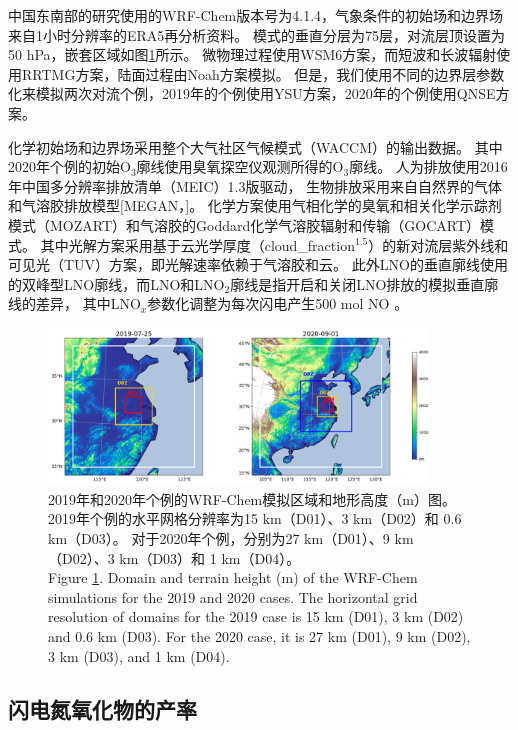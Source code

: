 中国东南部的研究使用的WRF-Chem版本号为4.1.4，气象条件的初始场和边界场来自1小时分辨率的ERA5再分析资料。
模式的垂直分层为75层，对流层顶设置为50 hPa，嵌套区域如图\ref{fig:domains_china}所示。
微物理过程使用WSM6方案\citep{Hong.2006a}，而短波和长波辐射使用RRTMG方案\citep{Iacono.2008}，陆面过程由Noah方案模拟\citep{Koren.1999}。
但是，我们使用不同的边界层参数化来模拟两次对流个例，2019年的个例使用YSU方案\citep{Hong.2006}，2020年的个例使用QNSE方案\citep{Sukoriansky.2005}。

化学初始场和边界场采用整个大气社区气候模式（WACCM）的输出数据。
其中2020年个例的初始O$_3$廓线使用臭氧探空仪观测所得的O$_3$廓线。
人为排放使用2016年中国多分辨率排放清单（MEIC）1.3版驱动，
生物排放采用来自自然界的气体和气溶胶排放模型[MEGAN，\citet{Guenther.2006}]。
化学方案使用气相化学的臭氧和相关化学示踪剂模式（MOZART）和气溶胶的Goddard化学气溶胶辐射和传输（GOCART）模式\citep{Pfister.2011}。
其中光解方案采用基于云光学厚度（cloud\_fraction$^{1.5}$）的新对流层紫外线和可见光（TUV）方案，即光解速率依赖于气溶胶和云。
此外LNO的垂直廓线使用\citet{Ott.2010}的双峰型LNO廓线\citep{Laughner.2017}，而LNO和LNO$_2$廓线是指开启和关闭LNO排放的模拟垂直廓线的差异，
其中LNO$_x$参数化调整为每次闪电产生500 mol NO \citep{Zhu.2019}。

\begin{figure}[H]
\centering
\includegraphics[width=0.9\textwidth]{./figures/domains_china.png}
\caption{2019年和2020年个例的WRF-Chem模拟区域和地形高度（m）图。
2019年个例的水平网格分辨率为15 km（D01）、3 km（D02）和 0.6 km（D03）。
对于2020年个例，分别为27 km（D01）、9 km（D02）、3 km（D03）和 1 km（D04）。\\
Figure \ref{fig:domains_china}. Domain and terrain height (m) of the WRF-Chem simulations for the 2019 and 2020 cases. The horizontal grid resolution of
domains for the 2019 case is 15 km (D01), 3 km (D02) and 0.6 km (D03). For the 2020 case, it is 27 km (D01), 9 km (D02), 3 km (D03),
and 1 km (D04).}
\label{fig:domains_china}
\end{figure}

\subsection{闪电氮氧化物的产率}

